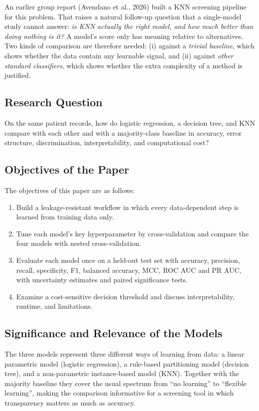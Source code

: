 \documentclass[12pt,a4paper]{article}
\begin{document}
An earlier group report (Avendano et al., 2026) built a KNN screening pipeline for this problem. That raises a natural follow-up question that a single-model study cannot answer: \emph{is KNN actually the right model, and how much better than doing nothing is it?} A model's score only has meaning relative to alternatives. Two kinds of comparison are therefore needed: (i) against a \emph{trivial baseline}, which shows whether the data contain any learnable signal, and (ii) against \emph{other standard classifiers}, which shows whether the extra complexity of a method is justified.

\subsection{Research Question}
\noindent On the same patient records, how do logistic regression, a decision tree, and KNN compare with each other and with a majority-class baseline in accuracy, error structure, discrimination, interpretability, and computational cost?

\subsection{Objectives of the Paper}
The objectives of this paper are as follows:
\begin{enumerate}[label=\arabic*.,itemsep=0pt]
  \item Build a leakage-resistant workflow in which every data-dependent step is learned from training data only.
  \item Tune each model's key hyperparameter by cross-validation and compare the four models with nested cross-validation.
  \item Evaluate each model once on a held-out test set with accuracy, precision, recall, specificity, F1, balanced accuracy, MCC, ROC AUC and PR AUC, with uncertainty estimates and paired significance tests.
  \item Examine a cost-sensitive decision threshold and discuss interpretability, runtime, and limitations.
\end{enumerate}
\subsection{Significance and Relevance of the Models}
\noindent The three models represent three different ways of learning from data: a linear parametric model (logistic regression), a rule-based partitioning model (decision tree), and a non-parametric instance-based model (KNN). Together with the majority baseline they cover the usual spectrum from ``no learning'' to ``flexible learning'', making the comparison informative for a screening tool in which transparency matters as much as accuracy.
\end{document}
